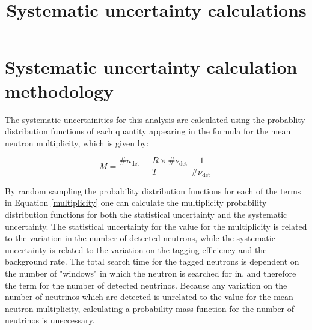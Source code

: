 \documentclass{article}
\title{Systematic uncertainty calculations}
\begin{document}
\maketitle



\section{Systematic uncertainty calculation methodology}\label{systmethod}


The systematic uncertainities for this analysis are calculated using the probablity distribution functions of each quantity appearing in the formula for the mean neutron multiplicity, which is given by:

\begin{equation}
    M=\frac{\# n_{\text {det }}-R \times \# \nu_{\text {det }}}{T} \frac{1}{\# \nu_{\text {det }}}
 \label{multiplicity}
\end{equation}



By random sampling the probability distribution functions for each of the terms in Equation \eqref{multiplicity} one can calculate the multiplicity probability distribution functions for both the statistical uncertainty and the systematic uncertainty. The statistical uncertainty for the value for the multiplicity is related to the variation in the number of detected neutrons, while the systematic uncertainty is related to the variation on the tagging efficiency and the background rate. The total search time for the tagged neutrons is dependent on the number of "windows" in which the neutron is searched for in, and therefore the term for the number of detected neutrinos. Because any variation on the number of neutrinos which are detected is unrelated to the value for the mean neutron multiplicity, calculating a probability mass function for the number of neutrinos is uneccessary. 
\end{document}
